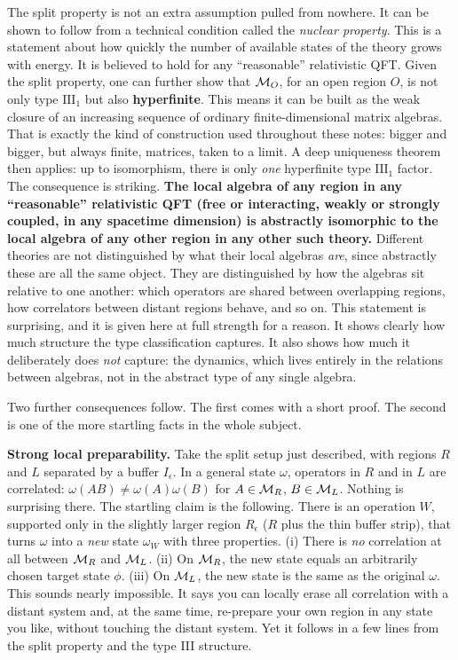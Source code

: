 The split property is not an extra assumption pulled from nowhere. It can be shown to follow from a technical
condition called the \emph{nuclear property}. This is a statement about how quickly the number of available
states of the theory grows with energy. It is believed to hold for any ``reasonable'' relativistic QFT. Given
the split property, one can further show that $\mathcal{M}_O$, for an open region $O$, is not only type
$\mathrm{III}_1$ but also \textbf{hyperfinite}. This means it can be built as the weak closure of an increasing
sequence of ordinary finite-dimensional matrix algebras. That is exactly the kind of construction used
throughout these notes: bigger and bigger, but always finite, matrices, taken to a limit. A deep uniqueness
theorem then applies: up to isomorphism, there is only \emph{one} hyperfinite type $\mathrm{III}_1$ factor. The
consequence is striking. \textbf{The local algebra of any region in any ``reasonable'' relativistic QFT (free or
interacting, weakly or strongly coupled, in any spacetime dimension) is abstractly isomorphic to the local
algebra of any other region in any other such theory.} Different theories are not distinguished by what their
local algebras \emph{are}, since abstractly these are all the same object. They are distinguished by how the
algebras sit relative to one another: which operators are shared between overlapping regions, how correlators
between distant regions behave, and so on. This statement is surprising, and it is given here at full strength
for a reason. It shows clearly how much structure the type classification captures. It also shows how much it
deliberately does \emph{not} capture: the dynamics, which lives entirely in the relations between algebras, not
in the abstract type of any single algebra.

Two further consequences follow. The first comes with a short proof. The second is one of the more startling
facts in the whole subject.

\textbf{Strong local preparability.} Take the split setup just described, with regions $R$ and $L$ separated by
a buffer $I_\epsilon$. In a general state $\omega$, operators in $R$ and in $L$ are correlated:
$\omega(AB)\ne\omega(A)\omega(B)$ for $A\in\mathcal{M}_R$, $B\in\mathcal{M}_L$. Nothing is surprising there. The startling claim is
the following. There is an operation $W$, supported only in the slightly larger region $R_\epsilon$ ($R$ plus
the thin buffer strip), that turns $\omega$ into a \emph{new} state $\omega_W$ with three properties. (i) There
is \emph{no} correlation at all between $\mathcal{M}_R$ and $\mathcal{M}_L$. (ii) On $\mathcal{M}_R$, the new state equals an arbitrarily
chosen target state $\phi$. (iii) On $\mathcal{M}_L$, the new state is the same as the original $\omega$. This sounds
nearly impossible. It says you can locally erase all correlation with a distant system and, at the same time,
re-prepare your own region in any state you like, without touching the distant system. Yet it follows in a few
lines from the split property and the type III structure.

